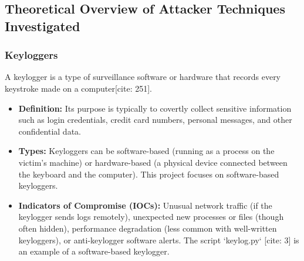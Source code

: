 \documentclass[11pt]{article}
\begin{document}
	\subsection{Theoretical Overview of Attacker Techniques Investigated}
	\subsubsection{Keyloggers}
	A keylogger is a type of surveillance software or hardware that records every keystroke made on a computer[cite: 251].
	\begin{itemize}
		\item \textbf{Definition:} Its purpose is typically to covertly collect sensitive information such as login credentials, credit card numbers, personal messages, and other confidential data.
		\item \textbf{Types:} Keyloggers can be software-based (running as a process on the victim's machine) or hardware-based (a physical device connected between the keyboard and the computer). This project focuses on software-based keyloggers.
		\item \textbf{Indicators of Compromise (IOCs):} Unusual network traffic (if the keylogger sends logs remotely), unexpected new processes or files (though often hidden), performance degradation (less common with well-written keyloggers), or anti-keylogger software alerts. The script `keylog.py` [cite: 3] is an example of a software-based keylogger.
	\end{itemize}
	
\end{document}
